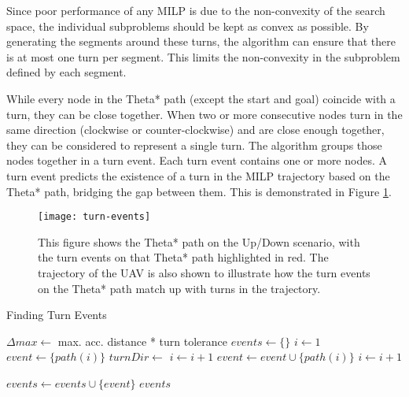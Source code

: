 \par
Since poor performance of any MILP is due to the non-convexity of the search space, the individual subproblems should be kept as convex as possible. By generating the segments around these turns, the algorithm can ensure that there is at most one turn per segment. This limits the non-convexity in the subproblem defined by each segment.
\par
While every node in the Theta* path (except the start and goal) coincide with a turn, they can be close together. When two or more consecutive nodes turn in the same direction (clockwise or counter-clockwise) and are close enough together, they can be considered to represent a single turn. The algorithm groups those nodes together in a turn event. Each turn event contains one or more nodes. A turn event predicts the existence of a turn in the MILP trajectory based on the   Theta* path, bridging the gap between them. This is demonstrated in Figure \ref{fig:turn-events}.

\begin{figure}
\centering
\texttt{[image: turn-events]}
\caption[A visualization of turn events]{This figure shows the Theta* path on the Up/Down scenario, with the turn events on that Theta* path highlighted in red. The trajectory of the UAV is also shown to illustrate how the turn events on the Theta* path match up with turns in the trajectory.}
\label{fig:turn-events}
\end{figure}
\newpage
\begin{algorithm}[t]
\caption{Finding Turn Events}
\label{alg:corners}
\begin{algorithmic}[1]
  \State $\Delta max \leftarrow$ max. acc. distance * turn tolerance
  \State $events \leftarrow \{\}$ 
  \State $i \leftarrow 1$ 
   
  	\State $event \leftarrow \{ path(i) \}$ 
  	\State $turnDir \leftarrow$  
    	\State $i \leftarrow  i + 1$
    		\Break {}
	\EndIf
		\Break {}
	\EndIf
	\State $event \leftarrow event \cup \{ path(i) \}$
	\State $i \leftarrow  i + 1$
	
    	\EndWhile
    	
    	\State $events \leftarrow events \cup \{ event \}$
  \EndWhile
\Return $events$
\EndFunction
\end{algorithmic}
\end{algorithm}

